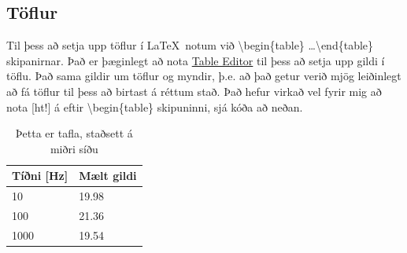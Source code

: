 \documentclass[a4paper]{article}
\begin{document}
\begin{minipage}{\linewidth} %
\end{minipage}



\subsection{Töflur }
Til þess að setja upp töflur í \LaTeX\ notum við \textbackslash begin\{table\} \dots \textbackslash end\{table\} skipanirnar. Það er þæginlegt að nota \href{http://truben.no/table/}{Table Editor} til þess að setja upp gildi í töflu. Það sama gildir um töflur og myndir, þ.e. að það getur verið mjög leiðinlegt að fá töflur til þess að birtast á réttum stað. Það hefur virkað vel fyrir mig að nota [ht!] á eftir  \textbackslash begin\{table\} skipuninni, sjá kóða að neðan.

\begin{table}[ht!] %
\centering	%
    \begin{tabular}{|l|l|}
    \hline
    Tíðni [Hz] & Mælt gildi \\ \hline
    10             & 19.98        \\ \hline
    100            & 21.36        \\ \hline
    1000           & 19.54        \\ \hline
    \end{tabular}
     \caption{Þetta er tafla, staðsett á miðri síðu}
\end{table}
\end{document}
